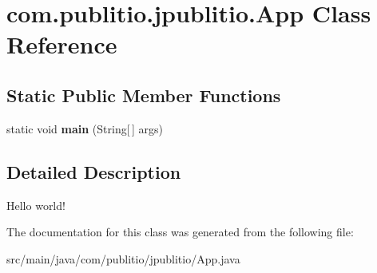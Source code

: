 \hypertarget{classcom_1_1publitio_1_1jpublitio_1_1App}{}\section{com.\+publitio.\+jpublitio.\+App Class Reference}
\label{classcom_1_1publitio_1_1jpublitio_1_1App}
\subsection*{Static Public Member Functions}
\begin{DoxyCompactItemize}
\item 
\mbox{\label{classcom_1_1publitio_1_1jpublitio_1_1App_a2eb5a41d0d25f121c79d2d3e258498ec}} 
static void {\bfseries main} (String\mbox{[}$\,$\mbox{]} args)
\end{DoxyCompactItemize}


\subsection{Detailed Description}
Hello world! 

The documentation for this class was generated from the following file\+:\begin{DoxyCompactItemize}
\item 
src/main/java/com/publitio/jpublitio/App.\+java\end{DoxyCompactItemize}
